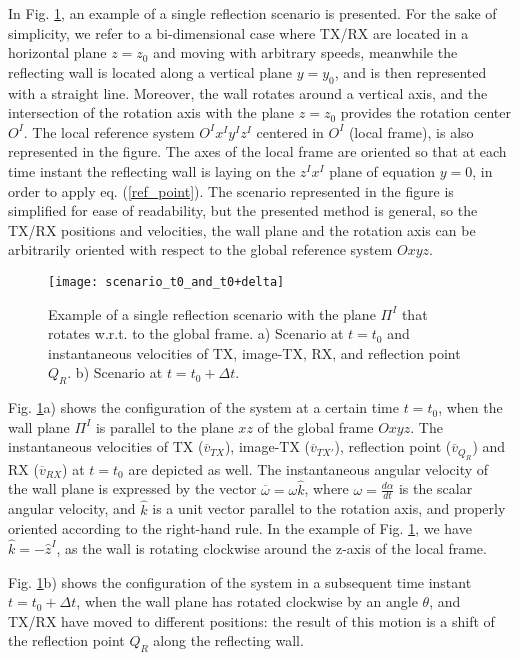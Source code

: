 In Fig. \ref{scenario_before_after}, an example of a single reflection scenario is presented. For the sake of simplicity, we refer to a bi-dimensional case where TX/RX are located in a horizontal plane $z=z_0$ and moving with arbitrary speeds, meanwhile the reflecting wall is located along a vertical plane $y=y_0$, and is then represented with a straight line. Moreover, the wall rotates around a vertical axis, and the intersection of the rotation axis with the plane $z=z_0$ provides the rotation center $O^I$. The local reference system $O^Ix^Iy^Iz^I$ centered in $O^I$ (local frame), is also represented in the figure. The axes of the local frame are oriented so that at each time instant the reflecting wall is laying on the $z^Ix^I$ plane of equation $y=0$, in order to apply eq. (\ref{ref_point}).
The scenario represented in the figure is simplified for ease of readability, but the presented method is general, so the TX/RX positions and velocities, the wall plane and the rotation axis can be arbitrarily oriented with respect to the global reference system $Oxyz$.

\begin{figure}[!ht]
	\centering
	\texttt{[image: scenario\_t0\_and\_t0+delta]}
	\caption{Example of a single reflection scenario with the plane $\Pi^I$ that rotates w.r.t. to the global frame. a) Scenario at $t=t_0$ and instantaneous velocities of TX, image-TX, RX, and reflection point $Q_R$. b) Scenario at $t=t_0+\Delta t$.}
	\label{scenario_before_after}
\end{figure}

Fig. \ref{scenario_before_after}a) shows the configuration of the system at a certain time $t=t_0$, when the wall plane $\Pi^{I}$ is parallel to the plane $xz$ of the global frame $Oxyz$. The instantaneous velocities of TX ($\overline{v}_{TX}$), image-TX ($\overline{v}_{TX'}$), reflection point ($\overline{v}_{Q_R}$) and RX ($\overline{v}_{RX}$) at $t=t_0$ are depicted as well. The instantaneous angular velocity of the wall plane is expressed by the vector $\overline{\omega}=\omega \hat{k}$, where $\omega=\frac{d \alpha}{dt}$ is the scalar angular velocity, and $\hat{k}$ is a unit vector parallel to the rotation axis, and properly oriented according to the right-hand rule. In the example of Fig. \ref{scenario_before_after}, we have $\hat{k}=-\hat{z}^I$, as the wall is rotating clockwise around the z-axis of the local frame.

Fig. \ref{scenario_before_after}b) shows the configuration of the system in a subsequent time instant $t=t_0+\Delta t$, when the wall plane has rotated clockwise by an angle $\theta$, and TX/RX have moved to different positions: the result of this motion is a shift of the reflection point $Q_R$ along the reflecting wall.  

